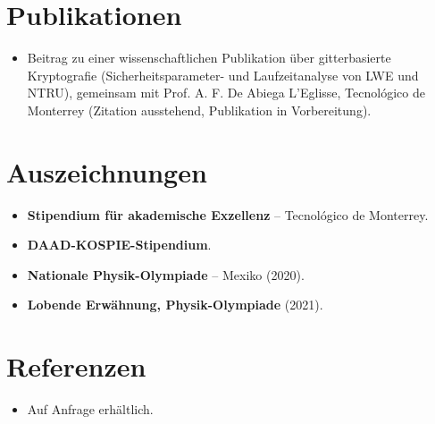 \documentclass[11pt,a4paper,sans]{moderncv}
\begin{document}

\section{Publikationen}
\vspace{1pt}
\begin{itemize}
\item Beitrag zu einer wissenschaftlichen Publikation über gitterbasierte Kryptografie (Sicherheitsparameter- und Laufzeitanalyse von LWE und NTRU), gemeinsam mit Prof. A. F. De Abiega L'Eglisse, Tecnológico de Monterrey (Zitation ausstehend, Publikation in Vorbereitung).
\end{itemize}


\section{Auszeichnungen}
\vspace{1pt}
\begin{itemize}
\item{\textbf{Stipendium für akademische Exzellenz} -- Tecnológico de Monterrey.}
\item{\textbf{DAAD-KOSPIE-Stipendium}.}
\item{\textbf{Nationale Physik-Olympiade} -- Mexiko (2020).}
\item{\textbf{Lobende Erwähnung, Physik-Olympiade} (2021).}
\end{itemize}


\section{Referenzen}
\vspace{1pt}
\begin{itemize}
\item{Auf Anfrage erhältlich.}
\end{itemize}
\end{document}
